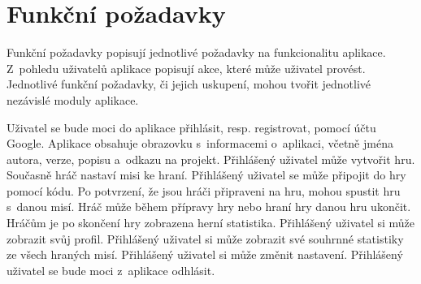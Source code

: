 \section{Funkční požadavky}

Funkční požadavky popisují jednotlivé požadavky na funkcionalitu aplikace.
Z~pohledu uživatelů aplikace popisují akce,
které může uživatel provést.
Jednotlivé funkční požadavky,
či jejich uskupení,
mohou tvořit jednotlivé nezávislé moduly aplikace.~\cite{fr_nfr}

\begin{enumerate}[label=\textbf{F\arabic*}, ref=F\arabic*]
Uživatel se bude moci do aplikace přihlásit, resp. registrovat,
pomocí účtu Google.
Aplikace obsahuje obrazovku s~informacemi o~aplikaci,
včetně jména autora, verze, popisu a~odkazu na projekt.
Přihlášený uživatel může vytvořit hru.
Současně hráč nastaví misi ke hraní.
Přihlášený uživatel se může připojit do hry pomocí kódu.
Po potvrzení, že jsou hráči připraveni na hru,
mohou spustit hru s~danou misí.
Hráč může během přípravy hry nebo hraní hry danou hru ukončit.
Hráčům je po skončení hry zobrazena herní statistika.
Přihlášený uživatel si může zobrazit svůj profil.
Přihlášený uživatel si může zobrazit své souhrnné statistiky
ze všech hraných misí.
    \label{req:settings}
Přihlášený uživatel si může změnit nastavení.
    \label{req:logout}
Přihlášený uživatel se bude moci z~aplikace odhlásit.
\end{enumerate}
